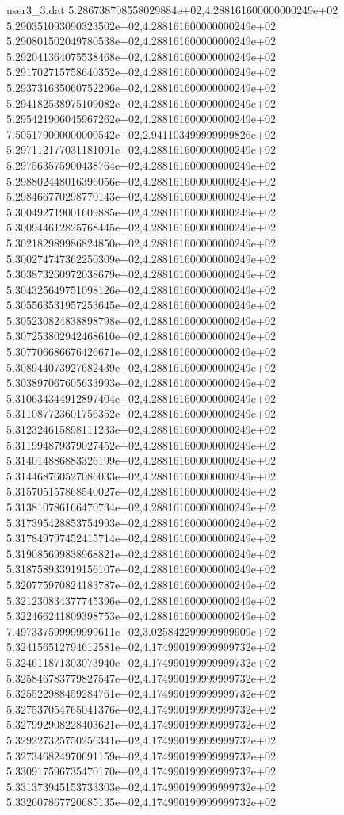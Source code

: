 \begin{filecontents}{user3_3.dat}
5.286738708558029884e+02,4.288161600000000249e+02
5.290351093090323502e+02,4.288161600000000249e+02
5.290801502049780538e+02,4.288161600000000249e+02
5.292041364075538468e+02,4.288161600000000249e+02
5.291702715758640352e+02,4.288161600000000249e+02
5.293731635060752296e+02,4.288161600000000249e+02
5.294182538975109082e+02,4.288161600000000249e+02
5.295421906045967262e+02,4.288161600000000249e+02
7.505179000000000542e+02,2.941103499999999826e+02
5.297112177031181091e+02,4.288161600000000249e+02
5.297563575900438764e+02,4.288161600000000249e+02
5.298802448016396056e+02,4.288161600000000249e+02
5.298466770298770143e+02,4.288161600000000249e+02
5.300492719001609885e+02,4.288161600000000249e+02
5.300944612825768445e+02,4.288161600000000249e+02
5.302182989986824850e+02,4.288161600000000249e+02
5.300274747362250309e+02,4.288161600000000249e+02
5.303873260972038679e+02,4.288161600000000249e+02
5.304325649751098126e+02,4.288161600000000249e+02
5.305563531957253645e+02,4.288161600000000249e+02
5.305230824838898798e+02,4.288161600000000249e+02
5.307253802942468610e+02,4.288161600000000249e+02
5.307706686676426671e+02,4.288161600000000249e+02
5.308944073927682439e+02,4.288161600000000249e+02
5.303897067605633993e+02,4.288161600000000249e+02
5.310634344912897404e+02,4.288161600000000249e+02
5.311087723601756352e+02,4.288161600000000249e+02
5.312324615898111233e+02,4.288161600000000249e+02
5.311994879379027452e+02,4.288161600000000249e+02
5.314014886883326199e+02,4.288161600000000249e+02
5.314468760527086033e+02,4.288161600000000249e+02
5.315705157868540027e+02,4.288161600000000249e+02
5.313810786166470734e+02,4.288161600000000249e+02
5.317395428853754993e+02,4.288161600000000249e+02
5.317849797452415714e+02,4.288161600000000249e+02
5.319085699838968821e+02,4.288161600000000249e+02
5.318758933919156107e+02,4.288161600000000249e+02
5.320775970824183787e+02,4.288161600000000249e+02
5.321230834377745396e+02,4.288161600000000249e+02
5.322466241809398753e+02,4.288161600000000249e+02
7.497337599999999611e+02,3.025842299999999909e+02
5.324156512794612581e+02,4.174990199999999732e+02
5.324611871303073940e+02,4.174990199999999732e+02
5.325846783779827547e+02,4.174990199999999732e+02
5.325522988459284761e+02,4.174990199999999732e+02
5.327537054765041376e+02,4.174990199999999732e+02
5.327992908228403621e+02,4.174990199999999732e+02
5.329227325750256341e+02,4.174990199999999732e+02
5.327346824970691159e+02,4.174990199999999732e+02
5.330917596735470170e+02,4.174990199999999732e+02
5.331373945153733303e+02,4.174990199999999732e+02
5.332607867720685135e+02,4.174990199999999732e+02

\end{filecontents}
